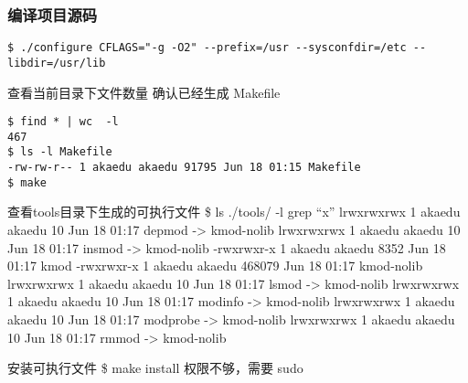 \documentclass[11pt,a4paper]{article}
\begin{document}
\subsubsection{编译项目源码}

{\begin{shaded}\begin{verbatim}
$ ./configure CFLAGS="-g -O2" --prefix=/usr --sysconfdir=/etc --libdir=/usr/lib
\end{verbatim}\end{shaded}}
查看当前目录下文件数量 确认已经生成 Makefile

{\begin{shaded}\begin{verbatim}
$ find * | wc  -l
467
$ ls -l Makefile
-rw-rw-r-- 1 akaedu akaedu 91795 Jun 18 01:15 Makefile
$ make
\end{verbatim}\end{shaded}}
查看tools目录下生成的可执行文件 \$ ls ./tools/ -l \textbar{} grep ``x''
lrwxrwxrwx 1 akaedu akaedu 10 Jun 18 01:17 depmod -\textgreater{}
kmod-nolib lrwxrwxrwx 1 akaedu akaedu 10 Jun 18 01:17 insmod
-\textgreater{} kmod-nolib -rwxrwxr-x 1 akaedu akaedu 8352 Jun 18 01:17
kmod -rwxrwxr-x 1 akaedu akaedu 468079 Jun 18 01:17 kmod-nolib
lrwxrwxrwx 1 akaedu akaedu 10 Jun 18 01:17 lsmod -\textgreater{}
kmod-nolib lrwxrwxrwx 1 akaedu akaedu 10 Jun 18 01:17 modinfo
-\textgreater{} kmod-nolib lrwxrwxrwx 1 akaedu akaedu 10 Jun 18 01:17
modprobe -\textgreater{} kmod-nolib lrwxrwxrwx 1 akaedu akaedu 10 Jun 18
01:17 rmmod -\textgreater{} kmod-nolib

安装可执行文件 \$ make install 权限不够，需要 sudo
\end{document}
